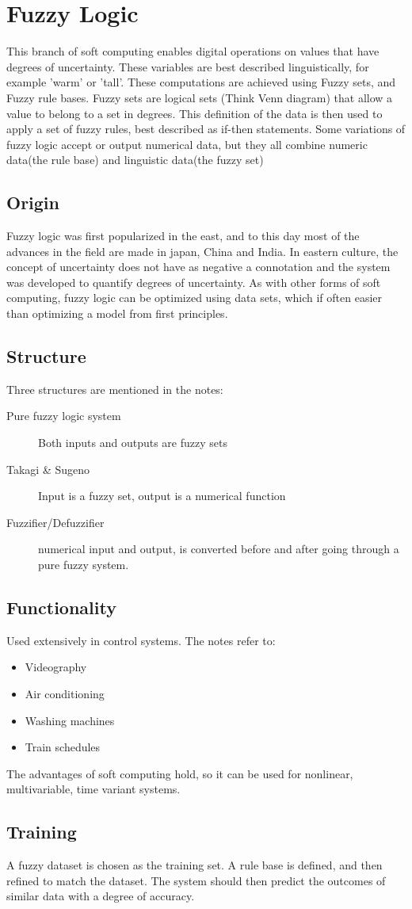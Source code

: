 \documentclass{report}
\begin{document}
\section{Fuzzy Logic}
This branch of soft computing enables digital operations on values that have degrees of uncertainty. These variables are best described linguistically, for example 'warm' or 'tall'. These computations are achieved using Fuzzy sets, and Fuzzy rule bases. Fuzzy sets are logical sets (Think Venn diagram) that allow a value to belong to a set in degrees. This definition of the data is then used to apply a set of fuzzy rules, best described as if-then statements. Some variations of fuzzy logic accept or output numerical data, but they all combine numeric data(the rule base) and linguistic data(the fuzzy set)
\subsection{Origin}
Fuzzy logic was first popularized in the east, and to this day most of the advances in the field are made in japan, China and India. In eastern culture, the concept of uncertainty does not have as negative a connotation and the system was developed to quantify degrees of uncertainty. As with other forms of soft computing, fuzzy logic can be optimized using data sets, which if often easier than optimizing a model from first principles.
\subsection{Structure}
Three structures are mentioned in the notes:
\begin{description}
	\item[Pure fuzzy logic system] Both inputs and outputs are fuzzy sets
	\item[Takagi \& Sugeno] Input is a fuzzy set, output is a numerical function
	\item[Fuzzifier/Defuzzifier] numerical input and output, is converted before and after going through a pure fuzzy system.
\end{description}
\subsection{Functionality}
Used extensively in control systems. The notes refer to:
\begin{itemize}
	\item Videography
	\item Air conditioning
	\item Washing machines
	\item Train schedules
\end{itemize}
The advantages of soft computing hold, so it can be used for nonlinear, multivariable, time variant systems. 
\subsection{Training}
A fuzzy dataset is chosen as the training set. A rule base is defined, and then refined to match the dataset. The system should then predict the outcomes of similar data with a degree of accuracy.
\end{document}
